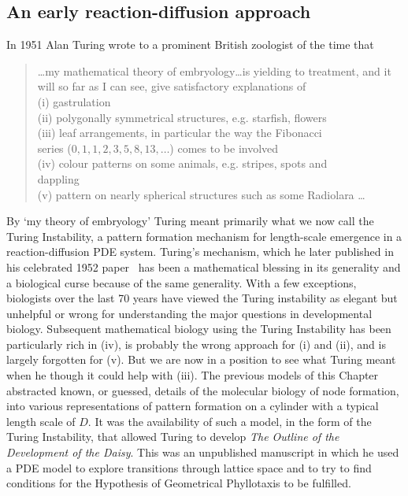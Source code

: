 \subsection{An early reaction-diffusion approach}
 In 1951 Alan Turing wrote to a prominent British zoologist of the time that 
\begin{quotation}
	\dots my mathematical theory of embryology\dots is yielding to 
	treatment, and it will so far as I can see, give satisfactory 
	explanations of\\
	(i) gastrulation\\
	(ii) polygonally symmetrical structures, e.g. starfish, flowers\\
	(iii) leaf arrangements, in particular the way the Fibonacci \\
	series ($0,1,1,2,3,5,8,13,\dots$) comes to be involved\\
	(iv) colour patterns on some animals, e.g. stripes, spots and \\
	dappling\\
	(v) pattern on nearly spherical structures such as some Radiolara \dots{}
\end{quotation}
By `my theory of embryology' Turing meant primarily what we now call the Turing Instability, a  pattern formation mechanism for length-scale emergence in a reaction-diffusion PDE system. 
Turing's mechanism, which he later published in his celebrated 1952 paper~\autocite{turingChemicalBasisMorphogenesis1952} has been a mathematical blessing in its generality and a biological curse because of the same generality. With a few exceptions, biologists over the last 70 years have viewed the Turing instability as elegant but unhelpful or wrong for understanding the major questions in developmental biology. 	 Subsequent mathematical biology using the Turing Instability has been particularly rich in (iv), is probably the wrong approach for (i) and (ii), and is largely forgotten for  (v). But we are now in a position to see what Turing meant when he though it could help with (iii). 
The previous models of this Chapter abstracted known, or guessed, details of the molecular biology of node formation, into various representations of pattern formation on a cylinder with a typical length scale of $D$. It was the availability of such a model, in the form of the Turing Instability,  that allowed Turing to develop \textit{The Outline of the Development of the Daisy}. This was an unpublished manuscript in which he used a PDE model to explore transitions through lattice space and to try to find conditions for  the Hypothesis of Geometrical Phyllotaxis to be fulfilled.


